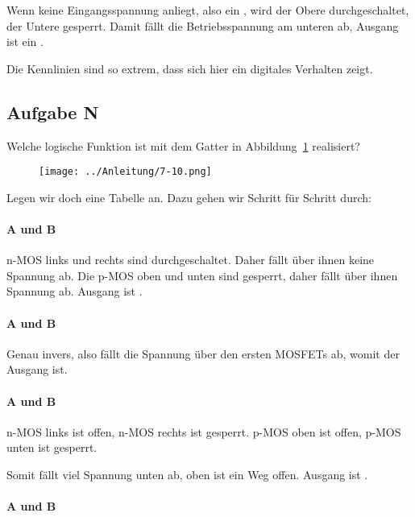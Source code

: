 Wenn keine Eingangsspannung anliegt, also ein \tlow, wird der Obere
durchgeschaltet, der Untere gesperrt. Damit fällt die Betriebsspannung am
unteren ab, Ausgang ist ein \thigh.

Die Kennlinien sind so extrem, dass sich hier ein digitales Verhalten zeigt.

\subsection{Aufgabe N}

\begin{problem}
	Welche logische Funktion ist mit dem Gatter in Abbildung~\ref{fig:7-10}
	realisiert?
\end{problem}

\begin{figure}[htbp]
	\centering
	\texttt{[image: ../Anleitung/7-10.png]}
	\caption{%
		\cite[Abbildung~7.10]{physik313-Anleitung}
	}
	\label{fig:7-10}
\end{figure}

Legen wir doch eine Tabelle an. Dazu gehen wir Schritt für Schritt durch:

\paragraph{A und B \tlow}

n-MOS links und rechts sind durchgeschaltet. Daher fällt über ihnen keine
Spannung ab. Die p-MOS oben und unten sind gesperrt, daher fällt über ihnen
Spannung ab. Ausgang ist \thigh.

\paragraph{A und B \thigh}

Genau invers, also fällt die Spannung über den ersten MOSFETs ab, womit der
Ausgang \tlow ist.

\paragraph{A \thigh{} und B \tlow}

n-MOS links ist offen, n-MOS rechts ist gesperrt. p-MOS oben ist offen, p-MOS
unten ist gesperrt.

Somit fällt viel Spannung unten ab, oben ist ein Weg offen. Ausgang ist \thigh.

\paragraph{A \tlow{} und B \thigh}

